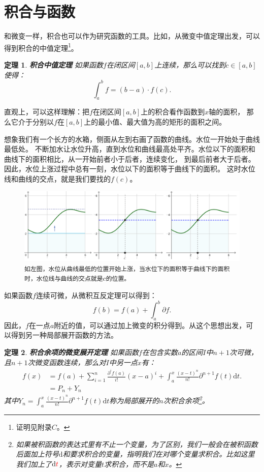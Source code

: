 \documentclass[12pt,UTF8]{ctexbook}
\newtheorem{tm}{定理}[section]
\begin{document}
\section{积合与函数}

和微变一样，积合也可以作为研究函数的工具。比如，从微变中值定理出发，可以得到积合的中值定理\footnote{证明见附录$C$。}。

\begin{tm}{\textbf{积合中值定理}}
    如果函数$f$在闭区间$[a,b]$上连续，那么可以找到$c\in[a,b]$使得：
    $$ \int_a^b f = (b - a)\cdot f(c).$$
\end{tm}

直观上，可以这样理解：把$f$在闭区间$[a,b]$上的积合看作函数到$x$轴的面积，
那么它介于分别以$f$在$[a,b]$上的最小值、最大值为高的矩形的面积之间。

想象我们有一个长方的水箱，侧面从左到右画了函数的曲线。水位一开始处于曲线最低处。
不断加水让水位升高，直到水位和曲线最高处平齐。水位以下的面积和曲线下的面积相比，从一开始前者小于后者，连续变化，
到最后前者大于后者。因此，水位上涨过程中总有一刻，水位以下的面积等于曲线下的面积。
这时水位线和曲线的交点，就是我们要找的$f(c)$。

\begin{figure}[h] %
    \vspace{4pt}
    \centering
    \includegraphics[width=\textwidth]{tu/积分中值定理1.png}
    \caption*{\texttt{如左图，水位从曲线最低的位置开始上涨，当水位下的面积等于曲线下的面积时，水位线与曲线的交点就是}$c$\texttt{的位置。}}
\end{figure}

如果函数$f$连续可微，从微积互反定理可以得到：
$$ f(b) = f(a) + \int_a^b \partial f .$$
因此，$f$在一点$a$附近的值，可以通过加上微变的积分得到。从这个思想出发，可以得到另一种局部展开函数的方法。

\begin{tm}{\textbf{积合余项的微变展开定理}}
如果函数$f$在包含实数$a$的区间$I$中$n+1$次可微，且$n+1$次微变函数连续，那么对$I$中另一点$x$有：
\begin{align*}
    f(x) &= f(a) + \sum_{i=1}^n \frac{\partial^i f(a)}{i!} (x - a)^i + \int_a^x \frac{(x - t)^{n}}{n!} \partial^{n+1} f(t)\mathrm{d}t. \\
    &= P_n + Y_n 
\end{align*}
其中$Y_n = \int_a^x \frac{(x - t)^{n}}{n!} \partial^{n+1} f(t)\mathrm{d}t$称为局部展开的$n$次积合余项\footnote{如果被积函数的表达式里有不止一个变量，为了区别，我们一般会在被积函数后面加上符号$\mathrm{d}$和要求积合的变量，指明我们在对哪个变量求积合。比如这里我们加上了$\mathrm{d}{\color{red}t}$，表示对变量$t$求积合，而不是$a$和$x$。}。

\end{tm}
\end{document}
